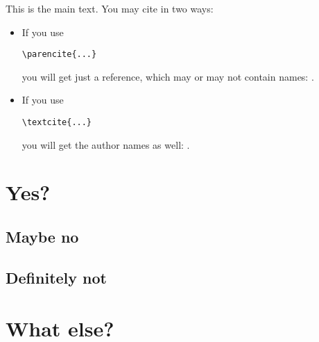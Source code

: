 This is the main text. You may cite in two ways:
\begin{itemize}
  \item If you use \begin{verbatim}\parencite{...}\end{verbatim} you will get just a reference, which may
    or may not contain names: \parencite{qian2021}.
  \item If you use \begin{verbatim}\textcite{...}\end{verbatim} you will get the author names as well: \textcite{qian2021}.
\end{itemize}

\lipsum[1-2]

\section{Yes?}

\subsection{Maybe no}

  \lipsum[3]

\subsection{Definitely not}
  \lipsum[4]
  
\section{What else?}
  \lipsum[5-13]
